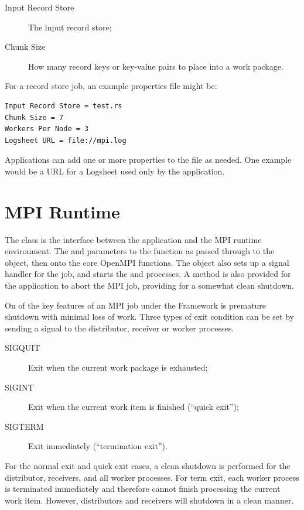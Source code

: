 \begin{description}
\item[Input Record Store] The input record store;
\item[Chunk Size] How many record keys or key-value pairs to place into a
work package.
\end{description}

For a record store job, an example properties file might be:
\begin{verbatim}
Input Record Store = test.rs
Chunk Size = 7
Workers Per Node = 3
Logsheet URL = file://mpi.log
\end{verbatim}

Applications can add one or more properties to the file as needed. One example
would be a URL for a Logsheet used only by the application.

\section{MPI Runtime}
\label{sec-mpiruntime}

The  class is the interface between the application and the
MPI runtime environment. The  and  parameters
to the  function as passed through to the 
object, then onto the core OpenMPI functions. The  object 
also sets up a signal handler for the job, and starts the 
and  processes.  A method is also provided for the application
to abort the MPI job, providing for a somewhat clean shutdown.

On of the key features of an MPI job under the Framework is premature shutdown
with minimal loss of work. Three types of exit condition can be set by sending
a signal to the distributor, receiver or worker processes. 

\begin{description}
\item[SIGQUIT] Exit when the current work package is exhausted;
\item[SIGINT] Exit when the current work item is finished (``quick exit'');
\item[SIGTERM] Exit immediately (``termination exit'').
\end{description}

For the normal exit and quick exit cases, a clean shutdown is performed for
the distributor, receivers, and all worker processes. For term exit, each
worker process is terminated immediately and therefore cannot finish processing
the current work item. However, distributors and receivers will shutdown in a
clean manner.

